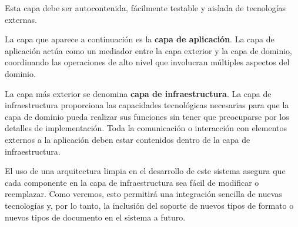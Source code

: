 Esta capa debe ser autocontenida, fácilmente testable y aislada de tecnologías externas.

La capa que aparece a continuación es la \textbf{capa de aplicación}.
La capa de aplicación actúa como un mediador entre la capa exterior y la capa de dominio, coordinando las operaciones
de alto nivel que involucran múltiples aspectos del dominio.

La capa más exterior se denomina \textbf{capa de infraestructura}.
La capa de infraestructura proporciona las capacidades tecnológicas necesarias para que la capa de dominio pueda
realizar sus funciones sin tener que preocuparse por los detalles de implementación.
Toda la comunicación o interacción con elementos externos a la aplicación deben estar contenidos dentro de la capa de
infraestructura.

El uso de una arquitectura limpia en el desarrollo de este sistema asegura que cada componente en la capa de
infraestructura sea fácil de modificar o reemplazar.
Como veremos, esto permitirá una integración sencilla de nuevas tecnologías y, por lo tanto, la inclusión del soporte
de nuevos tipos de formato o nuevos tipos de documento en el sistema a futuro.
